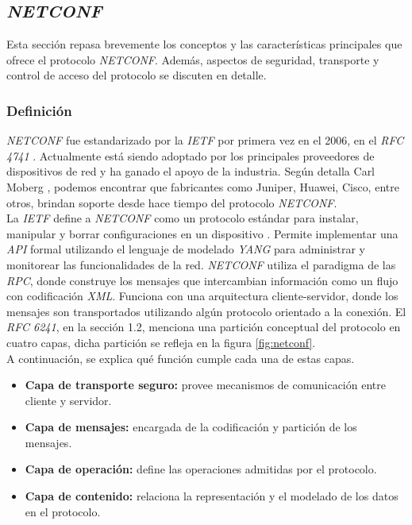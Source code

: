 \subsection{\textit{NETCONF}}
Esta sección repasa brevemente los conceptos y las características principales que ofrece el protocolo \textit{NETCONF}. Además, aspectos de seguridad, transporte y control de acceso del protocolo se discuten en detalle. 

\subsubsection{Definición}
\textit{NETCONF} fue estandarizado por la \textit{IETF} por primera vez en el 2006, en el \textit{RFC 4741} \parencite{netconfrfc}. Actualmente está siendo adoptado por los principales proveedores de dispositivos de red y ha ganado el apoyo de la industria. Según detalla Carl Moberg \parencite{netconfusos}, podemos encontrar que fabricantes como Juniper, Huawei, Cisco, entre otros, brindan soporte desde hace tiempo del protocolo \textit{NETCONF}. 
\\

La \textit{IETF} define a \textit{NETCONF} como un protocolo estándar para instalar, manipular y borrar configuraciones en un dispositivo \parencite{netconfrfcnuevo}. Permite implementar una \textit{API} formal utilizando el lenguaje de modelado \textit{YANG} para administrar y monitorear las funcionalidades de la red. \textit{NETCONF} utiliza el paradigma de las \textit{RPC}, donde construye los mensajes que intercambian información como un flujo con codificación \textit{XML}. Funciona con una arquitectura cliente-servidor, donde los mensajes son transportados utilizando algún protocolo orientado a la conexión. El \textit{RFC 6241}, en la sección 1.2, menciona una partición conceptual del protocolo en cuatro capas, dicha partición se refleja en la figura \ref{fig:netconf}. 
\\

A continuación, se explica qué función cumple cada una de estas capas.

\begin{itemize}
	\item \textbf{Capa de transporte seguro:} provee mecanismos de comunicación entre cliente y servidor.  
	\item \textbf{Capa de mensajes:} encargada de la codificación y partición de los mensajes.  
	\item \textbf{Capa de operación:} define las operaciones admitidas por el protocolo.
	\item \textbf{Capa de contenido:} relaciona la representación y el modelado de los datos en el protocolo.    
\end{itemize}

